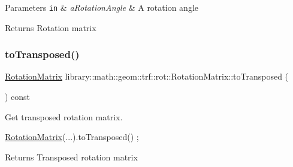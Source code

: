 \begin{DoxyParams}[1]{Parameters}
\mbox{\tt in}  & {\em a\+Rotation\+Angle} & A rotation angle \\
\hline
\end{DoxyParams}
\begin{DoxyReturn}{Returns}
Rotation matrix 
\end{DoxyReturn}
\mbox{\label{classlibrary_1_1math_1_1geom_1_1trf_1_1rot_1_1_rotation_matrix_aafb93f71d64ff383a58a9b9c4816a117}} 
\subsubsection{\texorpdfstring{to\+Transposed()}{toTransposed()}}
{\footnotesize\ttfamily \hyperlink{classlibrary_1_1math_1_1geom_1_1trf_1_1rot_1_1_rotation_matrix}{Rotation\+Matrix} library\+::math\+::geom\+::trf\+::rot\+::\+Rotation\+Matrix\+::to\+Transposed (\begin{DoxyParamCaption}{ }\end{DoxyParamCaption}) const}



Get transposed rotation matrix. 


\begin{DoxyCode}
\hyperlink{classlibrary_1_1math_1_1geom_1_1trf_1_1rot_1_1_rotation_matrix_a667d2c05aa5b0cc88775938d11164cdc}{RotationMatrix}(...).toTransposed() ;
\end{DoxyCode}


\begin{DoxyReturn}{Returns}
Transposed rotation matrix 
\end{DoxyReturn}
\mbox{\label{classlibrary_1_1math_1_1geom_1_1trf_1_1rot_1_1_rotation_matrix_ad289d307f62b26ab7e1340698388789a}} 
